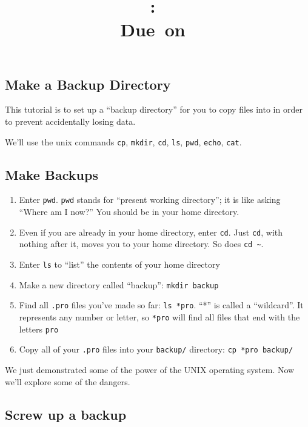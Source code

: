 \documentclass{article}
\title{\vspace{2in}\textmd{\textbf{\hmwkClass:\ \hmwkTitle}}\\\normalsize\vspace{0.1in}\small{Due\ on\ \hmwkDueDate}\\\vspace{0.1in}\large{}\vspace{3in}}
\date{}
\begin{document}
\begin{spacing}{1.0}
\newpage



\section{Make a Backup Directory}

This tutorial is to set up a ``backup directory'' for you to copy files into in
order to prevent accidentally losing data.

We'll use the unix commands \verb|cp|, \verb|mkdir|, \verb|cd|, \verb|ls|,
\verb|pwd|, \verb|echo|, \verb|cat|.

\subsection{Make Backups}

\begin{enumerate}
    \item Enter \verb|pwd|.  \verb|pwd| stands for ``present working
        directory''; it is like asking ``Where am I now?''
        You should be in your home directory.
    \item Even if you are already in your home directory, enter \verb|cd|.
        Just \verb|cd|, with nothing after it, moves you to your home
        directory.  So does \verb|cd ~|.
    \item Enter \verb|ls| to ``list'' the contents of your home directory
    \item Make a new directory called ``backup'': \verb|mkdir backup|
    \item Find all \verb|.pro| files you've made so far: \verb|ls *pro|.
        ``*'' is called a ``wildcard''.  It represents any number or letter, so
        \verb|*pro| will find all files that end with the letters \verb|pro|
    \item Copy all of your \verb|.pro| files into your \verb|backup/| directory:
        \verb|cp *pro backup/|
\end{enumerate}

We just demonstrated some of the power of the UNIX operating system.  Now we'll
explore some of the dangers.

\subsection{Screw up a backup}


\end{spacing}
\end{document}
